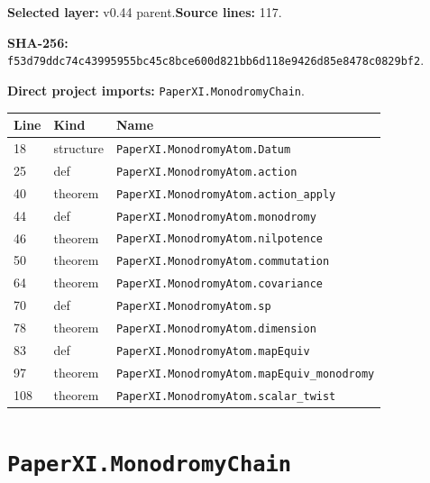 \documentclass[10pt,oneside]{book}
\begin{document}
\textbf{Selected layer:} v0.44 parent.\quad\textbf{Source lines:} 117.\par\textbf{SHA-256:} {\scriptsize\nolinkurl{f53d79ddc74c43995955bc45c8bce600d821bb6d118e9426d85e8478c0829bf2}}.


\textbf{Direct project imports:} \nolinkurl{PaperXI.MonodromyChain}.

\begin{longtable}{@{}p{}p{}p{}@{}}\toprule Line&Kind&Name\\\midrule\endhead

18&structure&\nolinkurl{PaperXI.MonodromyAtom.Datum}\\

25&def&\nolinkurl{PaperXI.MonodromyAtom.action}\\

40&theorem&\nolinkurl{PaperXI.MonodromyAtom.action_apply}\\

44&def&\nolinkurl{PaperXI.MonodromyAtom.monodromy}\\

46&theorem&\nolinkurl{PaperXI.MonodromyAtom.nilpotence}\\

50&theorem&\nolinkurl{PaperXI.MonodromyAtom.commutation}\\

64&theorem&\nolinkurl{PaperXI.MonodromyAtom.covariance}\\

70&def&\nolinkurl{PaperXI.MonodromyAtom.sp}\\

78&theorem&\nolinkurl{PaperXI.MonodromyAtom.dimension}\\

83&def&\nolinkurl{PaperXI.MonodromyAtom.mapEquiv}\\

97&theorem&\nolinkurl{PaperXI.MonodromyAtom.mapEquiv_monodromy}\\

108&theorem&\nolinkurl{PaperXI.MonodromyAtom.scalar_twist}\\

\bottomrule\end{longtable}

\section{\texorpdfstring{\nolinkurl{PaperXI.MonodromyChain}}{PaperXI.MonodromyChain}}\label{module:PaperXI.MonodromyChain}
\end{document}
